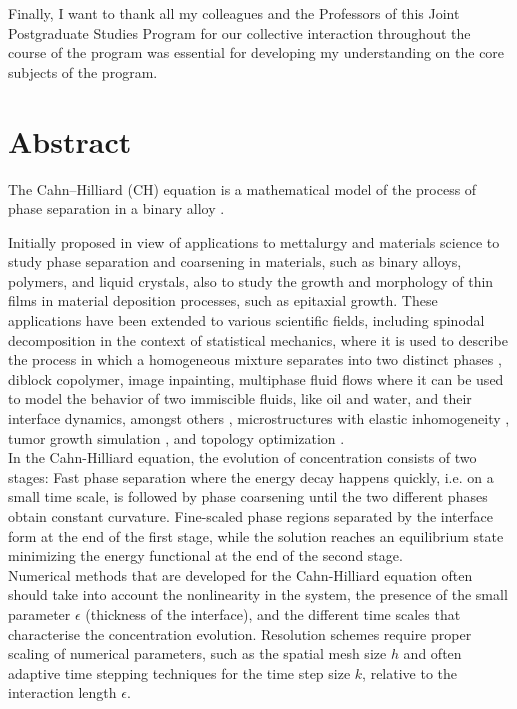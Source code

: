 \documentclass{article}
\begin{document}
Finally, I want to thank all my colleagues and the Professors of this Joint Postgraduate Studies Program for our collective interaction throughout the course of the program was essential for developing my understanding on the core subjects of the program.


\newpage
\section*{Abstract}
The Cahn--Hilliard (CH) equation is a mathematical model of the process of phase separation in a binary alloy \cite{Cahn1958FreeEO}. 

Initially proposed in view of applications to mettalurgy and materials science to study phase separation and coarsening in materials, such as binary alloys, polymers, and liquid crystals, also to study the growth and morphology of thin films in material deposition processes, such as epitaxial growth. These applications have been extended to various scientific fields, including spinodal decomposition in the context of statistical mechanics, where it is used to describe the process in which a homogeneous mixture separates into two distinct phases \cite{Cahn1958FreeEO,CAHN1961795}, diblock copolymer, image inpainting, multiphase fluid flows where it can be used to model the behavior of two immiscible fluids, like oil and water, and their interface dynamics, amongst others \cite{BADALASSI2003371}, microstructures with elastic inhomogeneity \cite{0a06993046834526b042d6c742445fc9}, tumor growth simulation \cite{MOHAMMADI2019919}, and topology optimization \cite{article}.\\

In the Cahn-Hilliard equation, the evolution of concentration consists of two stages:  Fast phase separation where the energy decay happens quickly, i.e. on a small time scale, is followed by phase coarsening until the two different phases obtain constant curvature. Fine-scaled phase regions separated by the interface form at the end of the first stage, while the solution reaches an equilibrium state minimizing the energy functional at the end of the second stage.\\

Numerical methods that are developed for the Cahn-Hilliard equation often should take into account the nonlinearity in the system, the presence of the small parameter $\epsilon$ (thickness of the interface), and the different time scales that characterise the concentration evolution. Resolution schemes require proper scaling of numerical parameters, such as the spatial mesh size $h$ and often adaptive time stepping techniques for the time step size $k$, relative to the interaction length $\epsilon$.\\
\end{document}

